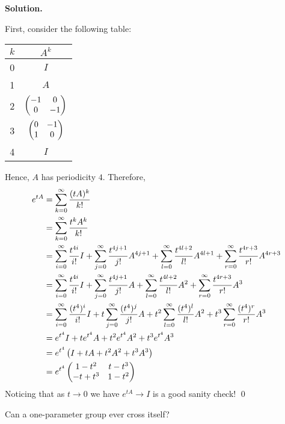 \documentclass[12pt]{book}
\theoremstyle{definition}
\newenvironment{solution}
{%
  \par\noindent\textbf{Solution.}\quad
}
{%
  \qed\par
}
\begin{document}
\begin{solution}
  First, consider the following table:

  \begin{table}[ht]
    \centering
    \begin{tabular}{c|c}

    $k$ & $A^k$  \\ 
    \hline
    0 & $I$ \\
    1 & $A$ \\
    2 & $\begin{pmatrix} -1 & 0 \\ 0 & -1 \end{pmatrix}$ \\
    3 & $\begin{pmatrix} 0 & -1 \\ 1 & 0 \end{pmatrix}$ \\
    4 & $I$ \\
    \end{tabular}
    \end{table}

  Hence, $A$ has periodicity $4$. 
  Therefore,
  \[
  \begin{aligned}
    e^{tA} &= \sum_{k=0}^\infty \frac{(tA)^k}{k!} \\
           &= \sum_{k=0}^\infty \frac{t^kA^k}{k!} \\
           &= \sum_{i=0}^\infty \frac{t^{4i}}{i!}I + \sum_{j=0}^\infty \frac{t^{4j + 1}}{j!}A^{4j+1} + \sum_{l=0}^\infty \frac{t^{4l + 2}}{l!}A^{4l+1} + \sum_{r=0}^\infty \frac{t^{4r + 3}}{r!}A^{4r+3} \\
           &= \sum_{i=0}^\infty \frac{t^{4i}}{i!}I + \sum_{j=0}^\infty \frac{t^{4j + 1}}{j!}A + \sum_{l=0}^\infty \frac{t^{4l + 2}}{l!}A^2 + \sum_{r=0}^\infty \frac{t^{4r + 3}}{r!}A^3 \\
           &= \sum_{i=0}^\infty \frac{(t^{4})^i}{i!}I + t\sum_{j=0}^\infty \frac{(t^{4})^j}{j!}A + t^2\sum_{l=0}^\infty \frac{(t^4)^l}{l!}A^2 + t^3\sum_{r=0}^\infty \frac{(t^4)^r}{r!}A^3 \\
           &= e^{t^4}I + te^{t^4}A + t^2e^{t^4}A^2 + t^3e^{t^4}A^3 \\
           &= e^{t^4}\left(I + tA + t^2A^2 + t^3A^3\right) \\
           &= e^{t^4} \begin{pmatrix} 1-t^2 & t - t^3 \\ -t + t^3 & 1 - t^2 \end{pmatrix}
  \end{aligned}
  \]  
  Noticing that as $t \to 0$ we have $e^{tA} \to I$ is a good sanity check!
\end{solution}

\begin{taggedexercise}[\textcolor{green}{Complete}]
  Can a one-parameter group ever cross itself?
\end{taggedexercise}
\end{document}
